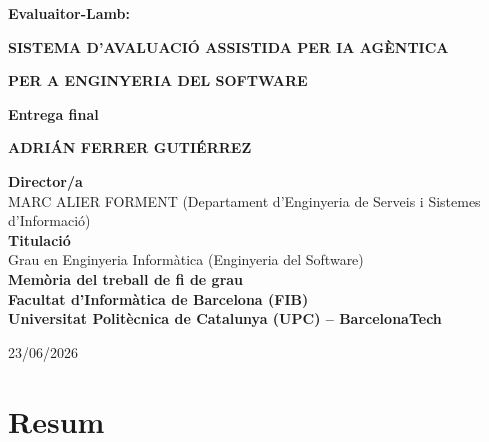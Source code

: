 \documentclass[12pt,a4paper,twoside]{report}
\begin{document}
\begin{titlepage}
\centering
\vspace*{1cm}

{\Huge\bfseries Evaluaitor-Lamb:\par}
\vspace{0.3cm}
{\Large\bfseries SISTEMA D'AVALUACI\'O ASSISTIDA PER IA AG\`ENTICA\par}
{\Large\bfseries PER A ENGINYERIA DEL SOFTWARE\par}

\vspace{2cm}

{\Large\bfseries Entrega final\par}

\vspace{1.5cm}

{\Large\bfseries ADRI\'AN FERRER GUTI\'ERREZ\par}

\vspace{1cm}

\begin{flushleft}
\large
\textbf{Director/a}\\
MARC ALIER FORMENT (Departament d'Enginyeria de Serveis i Sistemes d'Informaci\'o)\\[0.5cm]
\textbf{Titulaci\'o}\\
Grau en Enginyeria Inform\`atica (Enginyeria del Software)\\[0.5cm]
\textbf{Mem\`oria del treball de fi de grau}\\[0.5cm]
\textbf{Facultat d'Inform\`atica de Barcelona (FIB)}\\[0.5cm]
\textbf{Universitat Polit\`ecnica de Catalunya (UPC) -- BarcelonaTech}
\end{flushleft}

\vfill

{\large 23/06/2026\par}

\end{titlepage}

\chapter*{Resum}
\label{chap:resum}
\end{document}
